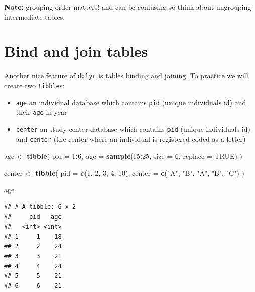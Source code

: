 \documentclass[
]{book}
\newenvironment{Shaded}{\begin{snugshade}}{\end{snugshade}}
\newcommand{\AttributeTok}[1]{\textcolor[rgb]{0.13,0.29,0.53}{#1}}
\newcommand{\ConstantTok}[1]{\textcolor[rgb]{0.56,0.35,0.01}{#1}}
\newcommand{\DecValTok}[1]{\textcolor[rgb]{0.00,0.00,0.81}{#1}}
\newcommand{\FunctionTok}[1]{\textcolor[rgb]{0.13,0.29,0.53}{\textbf{#1}}}
\newcommand{\NormalTok}[1]{#1}
\newcommand{\OtherTok}[1]{\textcolor[rgb]{0.56,0.35,0.01}{#1}}
\newcommand{\SpecialCharTok}[1]{\textcolor[rgb]{0.81,0.36,0.00}{\textbf{#1}}}
\newcommand{\StringTok}[1]{\textcolor[rgb]{0.31,0.60,0.02}{#1}}
\providecommand{\tightlist}{%
  \setlength{\itemsep}{0pt}\setlength{\parskip}{0pt}}
\begin{document}
\textbf{Note:} grouping order matters! and can be confusing so think about ungrouping intermediate tables.

\section{Bind and join tables}\label{bind-and-join-tables}

Another nice feature of \texttt{dplyr} is tables binding and joining. To practice we will create two \texttt{tibble}s:

\begin{itemize}
\tightlist
\item
  \texttt{age} an individual database which contains \texttt{pid} (unique individuals id)
  and their \texttt{age} in year
\item
  \texttt{center} an study center database which contains \texttt{pid} (unique individuals id)
  and \texttt{center} (the center where an individual is registered coded as a letter)
\end{itemize}

\begin{Shaded}
\begin{Highlighting}[]
\NormalTok{age }\OtherTok{\textless{}{-}}
  \FunctionTok{tibble}\NormalTok{(}
    \AttributeTok{pid =} \DecValTok{1}\SpecialCharTok{:}\DecValTok{6}\NormalTok{,}
    \AttributeTok{age =} \FunctionTok{sample}\NormalTok{(}\DecValTok{15}\SpecialCharTok{:}\DecValTok{25}\NormalTok{, }\AttributeTok{size =} \DecValTok{6}\NormalTok{, }\AttributeTok{replace =} \ConstantTok{TRUE}\NormalTok{)}
\NormalTok{  )}

\NormalTok{center }\OtherTok{\textless{}{-}}
  \FunctionTok{tibble}\NormalTok{(}
    \AttributeTok{pid =} \FunctionTok{c}\NormalTok{(}\DecValTok{1}\NormalTok{, }\DecValTok{2}\NormalTok{, }\DecValTok{3}\NormalTok{, }\DecValTok{4}\NormalTok{, }\DecValTok{10}\NormalTok{),}
    \AttributeTok{center =} \FunctionTok{c}\NormalTok{(}\StringTok{"A"}\NormalTok{, }\StringTok{"B"}\NormalTok{, }\StringTok{"A"}\NormalTok{, }\StringTok{"B"}\NormalTok{, }\StringTok{"C"}\NormalTok{)}
\NormalTok{  )}

\NormalTok{age}
\end{Highlighting}
\end{Shaded}

\begin{verbatim}
## # A tibble: 6 x 2
##     pid   age
##   <int> <int>
## 1     1    18
## 2     2    24
## 3     3    21
## 4     4    24
## 5     5    21
## 6     6    21
\end{verbatim}
\end{document}
